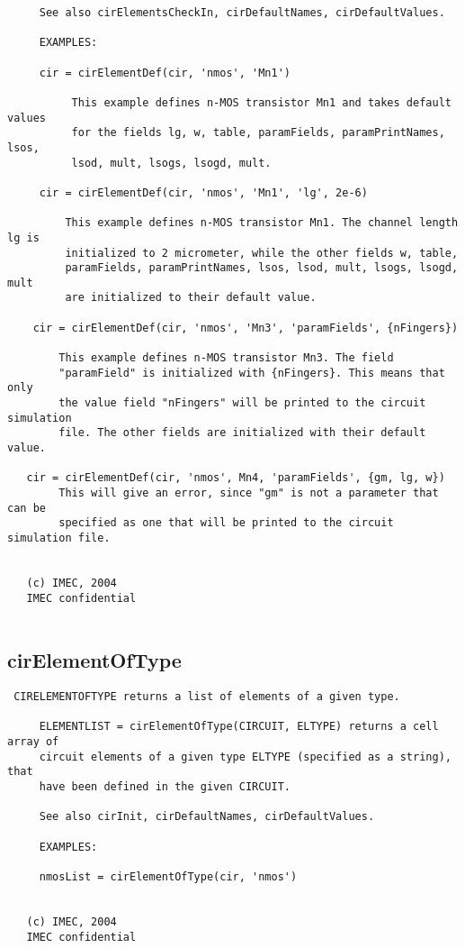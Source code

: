 \begin{verbatim}
     See also cirElementsCheckIn, cirDefaultNames, cirDefaultValues.
     
     EXAMPLES:
 
     cir = cirElementDef(cir, 'nmos', 'Mn1')
 
          This example defines n-MOS transistor Mn1 and takes default values
          for the fields lg, w, table, paramFields, paramPrintNames, lsos,
          lsod, mult, lsogs, lsogd, mult.
 
     cir = cirElementDef(cir, 'nmos', 'Mn1', 'lg', 2e-6)
 
         This example defines n-MOS transistor Mn1. The channel length lg is
         initialized to 2 micrometer, while the other fields w, table, 
         paramFields, paramPrintNames, lsos, lsod, mult, lsogs, lsogd, mult 
         are initialized to their default value.
 
    cir = cirElementDef(cir, 'nmos', 'Mn3', 'paramFields', {nFingers})
 
        This example defines n-MOS transistor Mn3. The field
        "paramField" is initialized with {nFingers}. This means that only
        the value field "nFingers" will be printed to the circuit simulation
        file. The other fields are initialized with their default value.
 
   cir = cirElementDef(cir, 'nmos', Mn4, 'paramFields', {gm, lg, w})
        This will give an error, since "gm" is not a parameter that can be
        specified as one that will be printed to the circuit simulation file.
 
 
   (c) IMEC, 2004
   IMEC confidential 
 

\end{verbatim}

\newpage
\subsection{cirElementOfType}
\label{sec:cirElementOfType}
\begin{verbatim}
 CIRELEMENTOFTYPE returns a list of elements of a given type.
 
     ELEMENTLIST = cirElementOfType(CIRCUIT, ELTYPE) returns a cell array of
     circuit elements of a given type ELTYPE (specified as a string), that
     have been defined in the given CIRCUIT.
 
     See also cirInit, cirDefaultNames, cirDefaultValues.
     
     EXAMPLES:
 
     nmosList = cirElementOfType(cir, 'nmos')
 
 
   (c) IMEC, 2004
   IMEC confidential 
 

\end{verbatim}


